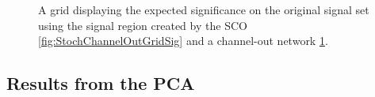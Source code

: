 \begin{figure}[H]
{\begin{subfigure}{.5\textwidth}
        \vspace{-1cm}
        \caption{}
        \label{fig:ChannelOutGridSig}
    \end{subfigure}
    }
    \caption{A grid displaying the expected significance on the original signal set using the signal region 
    created by the \acs{SCO} \ref{fig:StochChannelOutGridSig} and a channel-out network \ref{fig:ChannelOutGridSig}.}
    \label{fig:SCOCO}
\end{figure}

\subsection{Results from the PCA}\label{appendix:PCA}
\begin{figure}[H]
\end{figure}
